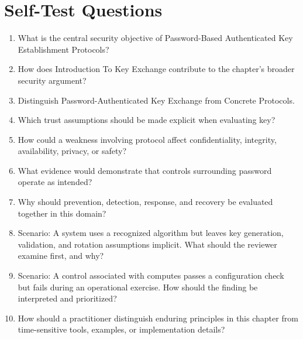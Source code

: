 \documentclass[11pt,letterpaper]{article}
\begin{document}
\section*{Self-Test Questions}
\begin{enumerate}
\item What is the central security objective of Password-Based Authenticated Key Establishment Protocols?
\item How does Introduction To Key Exchange contribute to the chapter's broader security argument?
\item Distinguish Password-Authenticated Key Exchange from Concrete Protocols.
\item Which trust assumptions should be made explicit when evaluating key?
\item How could a weakness involving protocol affect confidentiality, integrity, availability, privacy, or safety?
\item What evidence would demonstrate that controls surrounding password operate as intended?
\item Why should prevention, detection, response, and recovery be evaluated together in this domain?
\item Scenario: A system uses a recognized algorithm but leaves key generation, validation, and rotation assumptions implicit. What should the reviewer examine first, and why?
\item Scenario: A control associated with computes passes a configuration check but fails during an operational exercise. How should the finding be interpreted and prioritized?
\item How should a practitioner distinguish enduring principles in this chapter from time-sensitive tools, examples, or implementation details?
\end{enumerate}
\end{document}
